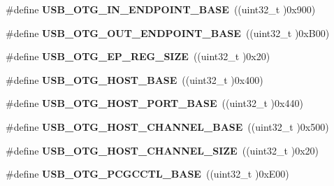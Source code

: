 \begin{DoxyCompactItemize}
\item 
\#define {\bfseries U\+S\+B\+\_\+\+O\+T\+G\+\_\+\+I\+N\+\_\+\+E\+N\+D\+P\+O\+I\+N\+T\+\_\+\+B\+A\+SE}~((uint32\+\_\+t )0x900)\hypertarget{group___peripheral__memory__map_gad8f69041452615aeb3948600e3882246}{}\label{group___peripheral__memory__map_gad8f69041452615aeb3948600e3882246}

\item 
\#define {\bfseries U\+S\+B\+\_\+\+O\+T\+G\+\_\+\+O\+U\+T\+\_\+\+E\+N\+D\+P\+O\+I\+N\+T\+\_\+\+B\+A\+SE}~((uint32\+\_\+t )0x\+B00)\hypertarget{group___peripheral__memory__map_gaf0e972b8f028ecf44a652029efbd4642}{}\label{group___peripheral__memory__map_gaf0e972b8f028ecf44a652029efbd4642}

\item 
\#define {\bfseries U\+S\+B\+\_\+\+O\+T\+G\+\_\+\+E\+P\+\_\+\+R\+E\+G\+\_\+\+S\+I\+ZE}~((uint32\+\_\+t )0x20)\hypertarget{group___peripheral__memory__map_ga6fdb7429ad88e2d69440d6ecc4f4199e}{}\label{group___peripheral__memory__map_ga6fdb7429ad88e2d69440d6ecc4f4199e}

\item 
\#define {\bfseries U\+S\+B\+\_\+\+O\+T\+G\+\_\+\+H\+O\+S\+T\+\_\+\+B\+A\+SE}~((uint32\+\_\+t )0x400)\hypertarget{group___peripheral__memory__map_ga3bb2dd6c82eefd8587b6146ba36ae071}{}\label{group___peripheral__memory__map_ga3bb2dd6c82eefd8587b6146ba36ae071}

\item 
\#define {\bfseries U\+S\+B\+\_\+\+O\+T\+G\+\_\+\+H\+O\+S\+T\+\_\+\+P\+O\+R\+T\+\_\+\+B\+A\+SE}~((uint32\+\_\+t )0x440)\hypertarget{group___peripheral__memory__map_ga42f433cb79ca69f09972e690fda6737a}{}\label{group___peripheral__memory__map_ga42f433cb79ca69f09972e690fda6737a}

\item 
\#define {\bfseries U\+S\+B\+\_\+\+O\+T\+G\+\_\+\+H\+O\+S\+T\+\_\+\+C\+H\+A\+N\+N\+E\+L\+\_\+\+B\+A\+SE}~((uint32\+\_\+t )0x500)\hypertarget{group___peripheral__memory__map_ga942c8c5241b80fbcf638fea0fa18bebd}{}\label{group___peripheral__memory__map_ga942c8c5241b80fbcf638fea0fa18bebd}

\item 
\#define {\bfseries U\+S\+B\+\_\+\+O\+T\+G\+\_\+\+H\+O\+S\+T\+\_\+\+C\+H\+A\+N\+N\+E\+L\+\_\+\+S\+I\+ZE}~((uint32\+\_\+t )0x20)\hypertarget{group___peripheral__memory__map_ga266cb1dbb50faf447f9c15d2ee93a522}{}\label{group___peripheral__memory__map_ga266cb1dbb50faf447f9c15d2ee93a522}

\item 
\#define {\bfseries U\+S\+B\+\_\+\+O\+T\+G\+\_\+\+P\+C\+G\+C\+C\+T\+L\+\_\+\+B\+A\+SE}~((uint32\+\_\+t )0x\+E00)\hypertarget{group___peripheral__memory__map_gaa9766975aca084c257730879568bc7cf}{}\label{group___peripheral__memory__map_gaa9766975aca084c257730879568bc7cf}


\end{DoxyCompactItemize}
